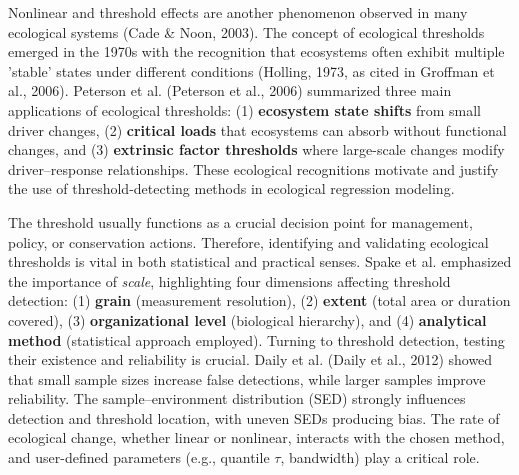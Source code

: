 Nonlinear and threshold effects are another phenomenon observed in many ecological 
systems \cite{Cade2003} (Cade \& Noon, 2003). 
The concept of ecological thresholds emerged in the 1970s with the recognition 
that ecosystems often exhibit multiple 'stable' states under different conditions 
\cite{Holling1973} (Holling, 1973, as cited in Groffman et al., 2006).  
Peterson et al. \cite{peterson2006ecological} (Peterson et al., 2006) summarized 
three main applications of ecological thresholds: (1) \textbf{ecosystem state shifts} from small driver changes, 
(2) \textbf{critical loads} that ecosystems can absorb without functional changes, and 
(3) \textbf{extrinsic factor thresholds} where large-scale changes modify driver–response relationships.
These ecological recognitions motivate and justify the use of threshold-detecting 
methods in ecological regression modeling.

The threshold usually functions as a crucial decision point for management,
policy, or conservation actions.
Therefore, identifying and validating ecological thresholds is vital in both 
statistical and practical senses. 
Spake et al. \cite{Spake2022} emphasized the importance of \textit{scale}, 
highlighting four dimensions affecting threshold detection: (1) \textbf{grain} (measurement resolution), 
(2) \textbf{extent} (total area or duration covered), (3) \textbf{organizational level} (biological hierarchy), 
and (4) \textbf{analytical method} (statistical approach employed).
Turning to threshold detection, testing their existence and reliability is crucial.  
Daily et al. \cite{Daily2012} (Daily et al., 2012) showed that small sample sizes increase false detections, 
while larger samples improve reliability.  
The sample–environment distribution (SED) strongly influences detection and threshold location, 
with uneven SEDs producing bias.  
The rate of ecological change, whether linear or nonlinear, interacts with the chosen method, 
and user-defined parameters (e.g., quantile \(\tau\), bandwidth) play a critical role.